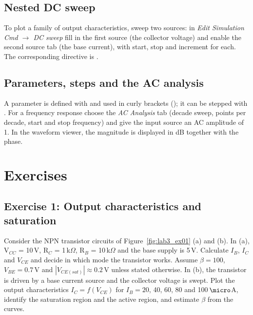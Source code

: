 
\subsection{Nested DC sweep}
To plot a family of output characteristics, sweep two sources: in \textit{Edit Simulation Cmd $\rightarrow$ DC sweep} fill in the first source (the collector voltage) and enable the second source tab (the base current), with start, stop and increment for each. The corresponding directive is .


\subsection{Parameters, steps and the AC analysis}
A parameter is defined with  and used in curly brackets (); it can be stepped with . For a frequency response choose the \textit{AC Analysis} tab (decade sweep, points per decade, start and stop frequency) and give the input source an AC amplitude of 1. In the waveform viewer, the magnitude is displayed in dB together with the phase.


\section{Exercises}

\subsection{Exercise 1: Output characteristics and saturation}
Consider the NPN transistor circuits of Figure~\ref{fig:lab3_ex01} (a) and (b). In (a), V$_{CC}$ = 10\,V, R$_C$ = 1\,k$\Omega$, R$_B$ = 10\,k$\Omega$ and the base supply is 5\,V. Calculate $I_B$, $I_C$ and $V_{CE}$ and decide in which mode the transistor works. Assume $\beta=100$, $V_{BE}=0.7$\,V and $|V_{CE(sat)}|\approx0.2$\,V unless stated otherwise. In (b), the transistor is driven by a base current source and the collector voltage is swept. Plot the output characteristics $I_C=f(V_{CE})$ for $I_B=20$, 40, 60, 80 and 100\,$\micro$A, identify the saturation region and the active region, and estimate $\beta$ from the curves.

